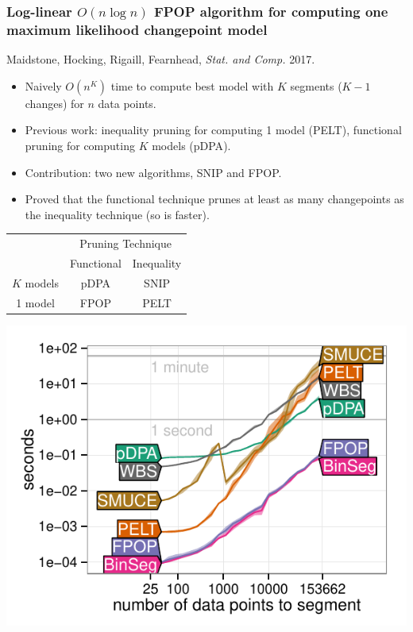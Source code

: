 \documentclass{beamer}
\newcommand{\algo}[1]{\textcolor{#1}{#1}}
\begin{document}
\begin{frame}
  \frametitle{Log-linear $O(n \log n)$ FPOP algorithm for computing one
    maximum
    likelihood changepoint model}

  Maidstone, Hocking, Rigaill, Fearnhead, {\it Stat. and
    Comp.} 2017.

  \begin{itemize}
  \item Naively $O(n^K)$ time to compute best model with $K$ segments
    ($K-1$ changes) for $n$ data points.
  \item Previous work: inequality pruning for computing 1 model (\algo{PELT}),
    functional pruning for computing $K$ models (\algo{pDPA}).
  \item Contribution: two new algorithms, SNIP and
    \algo{FPOP}.
  \item Proved that the functional technique prunes at least as many
    changepoints as the inequality technique (so is faster).
  \end{itemize}


  \begin{minipage}{0.55\linewidth}
        \begin{tabular}{c|cc}
      & \multicolumn{2}{c}{Pruning Technique}\\
      & Functional & Inequality \\ 
\hline
      $K$ models & \algo{pDPA} & SNIP \\
      1 model & \algo{FPOP} & \algo{PELT}
    \end{tabular}
  \end{minipage}
  \begin{minipage}{0.4\linewidth}
    \includegraphics[width=\textwidth]{figure-systemtime-arrays-bins}
  \end{minipage}
\end{frame}
\end{document}
